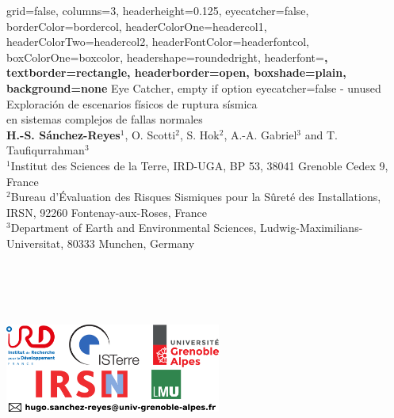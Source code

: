 


	

\color{standardfontcolor}

\begin{poster}{
		grid=false,
		columns=3,
		headerheight=0.125\textheight,
		eyecatcher=false,
        borderColor=bordercol,
		headerColorOne=headercol1,
		headerColorTwo=headercol2,
		headerFontColor=headerfontcol,
		boxColorOne=boxcolor,
		headershape=roundedright,
		headerfont=\sffamily\bfseries\Large,
		textborder=rectangle,
		headerborder=open,
		boxshade=plain,
		background=none
	}
	{
		Eye Catcher, empty if option eyecatcher=false - unused
	}
%
{
	\textsf %
	{\vskip 2.0cm \huge Exploraci\'on de escenarios f\'isicos de ruptura s\'ismica \\ en sistemas complejos de fallas normales
	}
}
{\sf\vspace{-0.1em}\\
	{\textbf{H.-S. S\'anchez-Reyes$^1$}, O. Scotti$^2$, S. Hok$^2$, A.-A. Gabriel$^3$ and T. Taufiqurrahman$^3$}
	\vspace{0.6em}\\
	\normalsize{$^1$Institut des Sciences de la Terre, IRD-UGA, BP 53, 38041 Grenoble Cedex 9, France \vspace{0.1em}\\
	$^2$Bureau d’Évaluation des Risques Sismiques pour la Sûreté des Installations, IRSN, 92260 Fontenay-aux-Roses, France
	\vspace{0.1em}\\
	$^3$Department of Earth and Environmental Sciences, Ludwig-Maximilians-Universitat, 80333 Munchen, Germany	 	
	} \\ \\ \\ \\ \\ 
}
{ \begin{minipage}{2cm}
  \vskip -0.2cm \hskip -5.2cm \includegraphics[width=7.1cm]{../../../logos/logo_poster_2022.png} \\
 \end{minipage}
 }


\end{poster}
